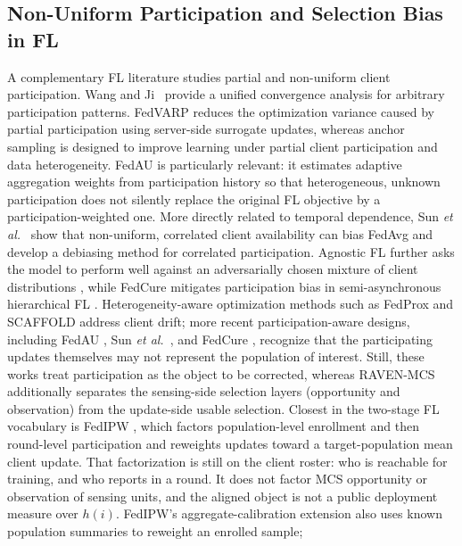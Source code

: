 \documentclass[letterpaper,journal]{IEEEtran}
\begin{document}
\subsection{Non-Uniform Participation and Selection Bias in FL}

A complementary FL literature studies partial and non-uniform client
participation.  Wang and Ji~\cite{wang2022unified} provide a unified convergence
analysis for arbitrary participation patterns.  FedVARP
\cite{jhunjhunwala2022fedvarp} reduces the optimization variance caused by
partial participation using server-side surrogate updates, whereas anchor
sampling \cite{wu2023anchor} is designed to improve learning under partial
client participation and data heterogeneity.  FedAU
\cite{wang2024lightweight} is particularly relevant: it estimates adaptive
aggregation weights from participation history so that heterogeneous,
unknown participation does not silently replace the original FL objective by
a participation-weighted one.  More directly related to temporal dependence,
Sun \emph{et al.}~\cite{sun2025debiasing} show that non-uniform, correlated
client availability can bias FedAvg and develop a debiasing method for
correlated participation.  Agnostic FL further asks the model to perform well
against an adversarially chosen mixture of client distributions
\cite{mohri2019agnostic}, while FedCure mitigates participation bias in
semi-asynchronous hierarchical FL \cite{chen2026fedcure}.  Heterogeneity-aware
optimization methods such as FedProx and SCAFFOLD
\cite{li2020fedprox,karimireddy2020scaffold} address client drift; more recent
participation-aware designs, including FedAU \cite{wang2024lightweight},
Sun \emph{et al.}~\cite{sun2025debiasing}, and FedCure \cite{chen2026fedcure},
recognize that the participating updates themselves may not represent the
population of interest.  Still, these works treat participation as the object
to be corrected, whereas RAVEN-MCS additionally separates the sensing-side
selection layers (opportunity and observation) from the update-side usable
selection.
Closest in the two-stage FL vocabulary is FedIPW
\cite{morishita2026who}, which factors population-level enrollment and then
round-level participation and reweights updates toward a target-population
mean client update.  That factorization is still on the client roster: who is
reachable for training, and who reports in a round.  It does not factor MCS
opportunity or observation of sensing units, and the aligned object is not a
public deployment measure over $h(i)$.  FedIPW's aggregate-calibration
extension also uses known population summaries to reweight an enrolled sample;
\end{document}
